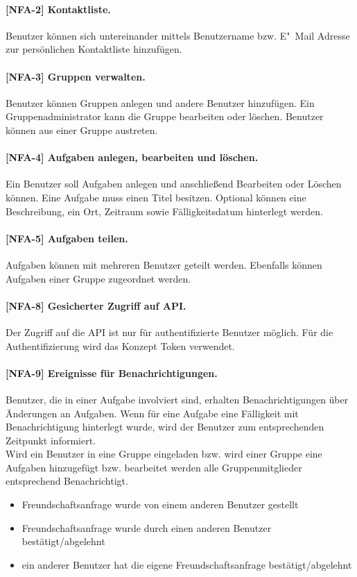 \paragraph{[NFA-2] Kontaktliste.}\label{fa-2} Benutzer können sich untereinander mittels Benutzername bzw. E"~Mail Adresse zur persönlichen Kontaktliste hinzufügen.

\paragraph{[NFA-3] Gruppen verwalten. }\label{fa-3} Benutzer können Gruppen anlegen und andere Benutzer hinzufügen. Ein Gruppenadministrator kann die Gruppe bearbeiten oder löschen. Benutzer können aus einer Gruppe austreten.

\paragraph{[NFA-4] Aufgaben anlegen, bearbeiten und löschen.}\label{fa-4} Ein Benutzer soll Aufgaben anlegen und anschließend Bearbeiten oder Löschen können.
Eine Aufgabe muss einen Titel besitzen. Optional können eine Beschreibung, ein Ort, Zeitraum sowie Fälligkeitsdatum hinterlegt werden.

\paragraph{[NFA-5] Aufgaben teilen.} \label{fa-5} Aufgaben können mit mehreren Benutzer geteilt werden. Ebenfalls können Aufgaben einer Gruppe zugeordnet werden. 

\paragraph{[NFA-8] Gesicherter Zugriff auf API.} Der Zugriff auf die API ist nur für authentifizierte Benutzer möglich. Für die Authentifizierung wird das Konzept Token verwendet. \\

\paragraph{[NFA-9] Ereignisse für Benachrichtigungen.}\label{nfa-9} Benutzer, die in einer Aufgabe involviert sind, erhalten Benachrichtigungen über Änderungen an Aufgaben. Wenn für eine Aufgabe eine Fälligkeit mit Benachrichtigung hinterlegt wurde, wird der Benutzer zum entsprechenden Zeitpunkt informiert.\\
Wird ein Benutzer in eine Gruppe eingeladen bzw. wird einer Gruppe eine Aufgaben hinzugefügt bzw. bearbeitet werden alle Gruppenmitglieder entsprechend Benachrichtigt.
\begin{itemize}
\item Freundschaftsanfrage wurde von einem anderen Benutzer gestellt
\item Freundschaftsanfrage wurde durch einen anderen Benutzer bestätigt/abgelehnt
\item ein anderer Benutzer hat die eigene Freundschaftsanfrage bestätigt/abgelehnt
\end{itemize}

